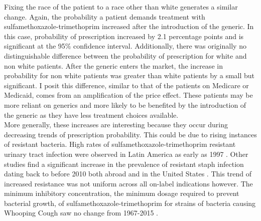 \indent Fixing the race of the patient to a race other than white generates a similar change. Again, the probability a patient demands treatment with sulfamethoxazole-trimethoprim increased after the introduction of the generic. In this case, probability of prescription increased by 2.1 percentage points and is significant at the 95\% confidence interval. Additionally, there was originally no distinguishable difference between the probability of prescription for white and non white patients. After the generic enters the market, the increase in probability for non white patients was greater than white patients by a small but significant. I posit this difference, similar to that of the patients on Medicare or Medicaid, comes from an amplification of the price effect. These patients may be more reliant on generics and more likely to be benefited by the introduction of the generic as they have less treatment choices available.\\
\indent More generally, these increases are interesting because they occur during decreasing trends of prescription probability. This could be due to rising instances of resistant bacteria. High rates of sulfamethoxazole-trimethoprim resistant urinary tract infection were observed in Latin America as early as 1997 \cite{gales_urinary_2002}. Other studies find a significant increase in the prevalence of resistant staph infection dating back to before 2010 both abroad \cite{noauthor_resistance_nodate} and in the United States \cite{khamash_increasing_2019}. This trend of increased resistance was not uniform across all on-label indications however. The minimum inhibitory concentration, the minimum dosage required to prevent bacterial growth, of sulfamethoxazole-trimethoprim for strains of bacteria causing Whooping Cough saw no change from 1967-2015 \cite{jakubu_trends_2017}.
